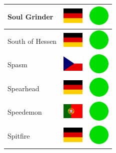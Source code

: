 \documentclass[12pt, a4paper, twoside]{report}
\begin{document}
\begin{center}
\begin{longtable}{|p{5cm}|p{2cm}|p{2cm}|}
 Soul Grinder                                               & \includegraphics[width=1cm]{../4x3/de} &   \includegraphics[width=1cm]{../likes/y} \\ \hline
 South of Hessen                                            & \includegraphics[width=1cm]{../4x3/de} &   \includegraphics[width=1cm]{../likes/y} \\ \hline
 Spasm                                                      & \includegraphics[width=1cm]{../4x3/cz} &   \includegraphics[width=1cm]{../likes/y} \\ \hline
 Spearhead                                                  & \includegraphics[width=1cm]{../4x3/de} &   \includegraphics[width=1cm]{../likes/y} \\ \hline
 Speedemon                                                  & \includegraphics[width=1cm]{../4x3/pt} &   \includegraphics[width=1cm]{../likes/y} \\ \hline
 Spitfire                                                   & \includegraphics[width=1cm]{../4x3/de} &   \includegraphics[width=1cm]{../likes/y} \\ \hline

\end{longtable}
\end{center}
\end{document}
